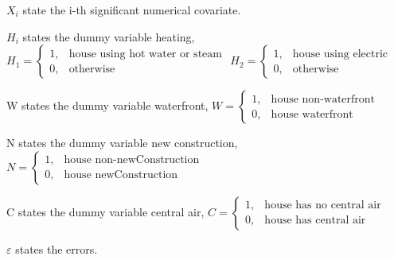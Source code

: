 \documentclass[12pt]{article}
\begin{document}
\noindent
$X_i$ state the i-th significant numerical covariate.

\noindent
$H_i$ states the dummy variable heating, $H_1=
\begin{cases}
1,& \text{house using hot water or steam}\\
0,& \text{otherwise}
\end{cases}$
$H_2=
\begin{cases}
1,& \text{house using electric}\\
0,& \text{otherwise}
\end{cases}$

\noindent
W states the dummy variable waterfront, $W=
\begin{cases}
1,& \text{house non-waterfront}\\
0,& \text{house waterfront}
\end{cases}$

\noindent
N states the dummy variable new construction, $N=
\begin{cases}
1,& \text{house non-newConstruction}\\
0,& \text{house newConstruction}
\end{cases}$

\noindent
C states the dummy variable central air, $C=
\begin{cases}
1,& \text{house has no central air}\\
0,& \text{house has central air}
\end{cases}$

\noindent
$\varepsilon$ states the errors.
\end{document}
